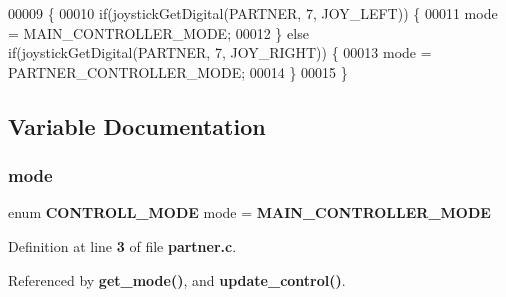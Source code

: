 \begin{DoxyCode}
00009                       \{
00010   \textcolor{keywordflow}{if}(joystickGetDigital(PARTNER, 7, JOY\_LEFT)) \{
00011     mode = MAIN_CONTROLLER_MODE;
00012   \} \textcolor{keywordflow}{else} \textcolor{keywordflow}{if}(joystickGetDigital(PARTNER, 7, JOY\_RIGHT)) \{
00013     mode = PARTNER_CONTROLLER_MODE;
00014   \}
00015 \}
\end{DoxyCode}


\subsection{Variable Documentation}
\mbox{\label{partner_8c_ac57f7e8cb1c4e638c8c477740314a109}} 
\subsubsection{mode}
{\footnotesize\ttfamily enum \textbf{ C\+O\+N\+T\+R\+O\+L\+L\+\_\+\+M\+O\+DE} mode = \textbf{ M\+A\+I\+N\+\_\+\+C\+O\+N\+T\+R\+O\+L\+L\+E\+R\+\_\+\+M\+O\+DE}\hspace{0.3cm}{\ttfamily [static]}}



Definition at line \textbf{ 3} of file \textbf{ partner.\+c}.



Referenced by \textbf{ get\+\_\+mode()}, and \textbf{ update\+\_\+control()}.

